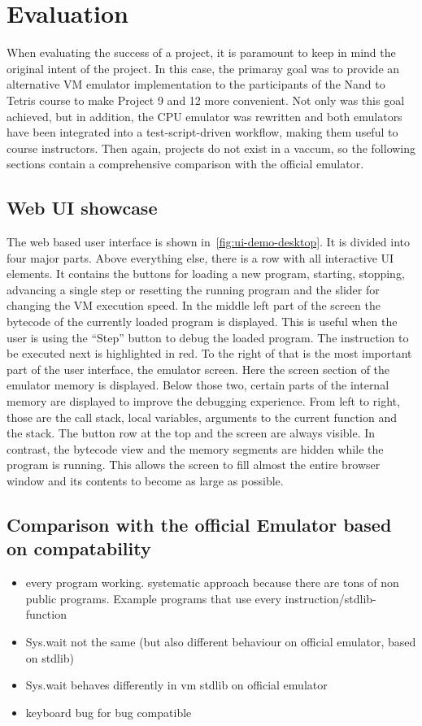 \section{Evaluation} \label{evaluation}
When evaluating the success of a project, it is paramount to keep in mind the original intent of the project.
In this case, the primaray goal was to provide an alternative VM emulator implementation to the participants of the Nand to Tetris course to make Project 9 and 12 more convenient.
Not only was this goal achieved, but in addition, the CPU emulator was rewritten and both emulators have been integrated into a test-script-driven workflow, making them useful to course instructors.
Then again, projects do not exist in a vaccum, so the following sections contain a comprehensive comparison with the official emulator.

\subsection{Web UI showcase}
The web based user interface is shown in~\cref{fig:ui-demo-desktop}. It is divided into four major parts.
Above everything else, there is a row with all interactive UI elements. It contains the buttons for loading a new program, starting, stopping, advancing a single step or resetting the running program and the slider for changing the VM execution speed.
In the middle left part of the screen the bytecode of the currently loaded program is displayed. This is useful when the user is using the ``Step'' button to debug the loaded program. The instruction to be executed next is highlighted in red.
To the right of that is the most important part of the user interface, the emulator screen.
Here the screen section of the emulator memory is displayed.
Below those two, certain parts of the internal memory are displayed to improve the debugging experience. From left to right, those are the call stack, local variables, arguments to the current function and the stack.
The button row at the top and the screen are always visible.
In contrast, the bytecode view and the memory segments are hidden while the program is running. This allows the screen to fill almost the entire browser window and its contents to become as large as possible.


\subsection{Comparison with the official Emulator based on compatability} \label{compatibility}
\begin{itemize}
  \item every program working. systematic approach because there are tons of non public programs. Example programs that use every instruction/stdlib-function
  \item Sys.wait not the same (but also different behaviour on official emulator, based on stdlib) \label{sys.wait-compatibility}
  \item Sys.wait behaves differently in vm stdlib on official emulator
  \item keyboard bug for bug compatible
\end{itemize}

